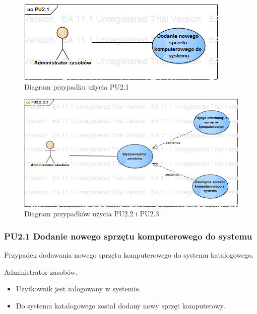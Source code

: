\begin{figure}[h!]
	\centering
	\includegraphics[scale=0.6]{img/diagrams/useCaseDiagrams/PU2_1.png}
	\caption{Diagram przypadku użycia PU2.1 \label{fig:labelUCPU2.1}}
\end{figure}

\begin{figure}[h!]
	\centering
	\includegraphics[scale=0.6]{img/diagrams/useCaseDiagrams/PU2_2_2_3.png}
	\caption{Diagram przypadków użycia PU2.2 i PU2.3 \label{fig:labelUCPU2.2_2.3}}
\end{figure}

\subsubsection{PU2.1 Dodanie nowego sprzętu komputerowego do systemu}

Przypadek dodawania nowego sprzętu komputerowego do systemu katalogowego.

Administrator zasobów.

\begin{itemize}
\item Użytkownik jest zalogowany w systemie.
\end{itemize}

\begin{itemize}
\item Do systemu katalogowego został dodany nowy sprzęt komputerowy.
\end{itemize}

